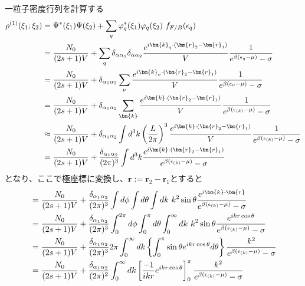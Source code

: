 \documentclass[dvipdfmx, 11pt, a4paper]{jsarticle}
\numberwithin{equation}{section}
\theoremstyle{definition}
\begin{document}
    \begin{derivationBox}
        一粒子密度行列を計算する
        \begin{align}
            \rho^{(1)} (\xi_1;\xi_2) &= \Psi^* (\xi_1) \Psi(\xi_2) + \sum_q \varphi_q^* (\xi_1)\varphi_{q} (\xi_2)\ f_{F/B} (\epsilon_q) \notag \\
            &= \frac{N_0}{(2s+1)V} +  \sum_q {\delta_{\alpha \alpha_1}} {\delta_{\alpha \alpha_2}}\frac{e^{i\bm{k}_q \cdot(\bm{r}_2 - \bm{r}_1)}}{V} \frac{1}{e^{\beta (\epsilon_q -\mu)}-\sigma} \notag \\
            &= \frac{N_0}{(2s+1)V} + {\delta_{\alpha_1 \alpha_2}} \sum_\nu  \frac{e^{i\bm{k}_\nu \cdot(\bm{r}_2 - \bm{r}_1)}}{V} \frac{1}{e^{\beta (\epsilon_\nu -\mu)}-\sigma} \notag \\
            &= \frac{N_0}{(2s+1)V} + {\delta_{\alpha_1 \alpha_2}} \sum_{\bm{k}} \frac{e^{i\bm{k} \cdot(\bm{r}_2 - \bm{r}_1)}}{V} \frac{1}{e^{\beta (\epsilon_{(k)} -\mu)}-\sigma} \notag \\
            &\approx \frac{N_0}{(2s+1)V} + {\delta_{\alpha_1 \alpha_2}} \int d^3 k \left( \frac{L}{2\pi} \right)^3  \frac{e^{i\bm{k} \cdot(\bm{r}_2 - \bm{r}_1)}}{V} \frac{1}{e^{\beta (\epsilon_{(k)} -\mu)}-\sigma} \notag \\
            &= \frac{N_0}{(2s+1)V} +  \frac{\delta_{\alpha_1 \alpha_2}}{(2\pi)^3}\int d^3 k \frac{e^{i\bm{k} \cdot(\bm{r}_2 - \bm{r}_1)}}{e^{\beta (\epsilon_{(k)} -\mu)}-\sigma}
        \end{align}
        となり、ここで極座標に変換し、$\bm{r}:=\bm{r}_2 - \bm{r}_1$とすると
        \begin{align}
            &= \frac{N_0}{(2s+1)V} +  \frac{\delta_{\alpha_1 \alpha_2}}{(2\pi)^3}\int d\phi \int d\theta \int dk\ k^2 \sin \theta \frac{e^{i\bm{k} \cdot \bm{r}}}{e^{\beta (\epsilon_{(k)} -\mu)}-\sigma} \notag \\
            &= \frac{N_0}{(2s+1)V} +  \frac{\delta_{\alpha_1 \alpha_2}}{(2\pi)^3}\int_0^{2\pi} d\phi \int_0^{\pi} d\theta \int_0^\infty dk\ k^2 \sin \theta \frac{e^{ikr \cos \theta}}{e^{\beta (\epsilon_{(k)} -\mu)}-\sigma} \notag \\
            &= \frac{N_0}{(2s+1)V} +  \frac{\delta_{\alpha_1 \alpha_2}}{(2\pi)^3}2\pi \int_0^\infty dk \left\{ \int_0^{\pi} \sin \theta e^{ikr \cos \theta} d\theta \right\} \frac{k^2}{e^{\beta (\epsilon_{(k)} -\mu)}-\sigma} \notag \\
            &= \frac{N_0}{(2s+1)V} +  \frac{\delta_{\alpha_1 \alpha_2}}{(2\pi)^2} \int_0^\infty dk \left[ \frac{-1}{ikr} e^{ikr \cos \theta}  \right]_0^\pi \frac{k^2}{e^{\beta (\epsilon_{(k)} -\mu)}-\sigma} \notag \\

\end{align}
\end{derivationBox}
\end{document}
